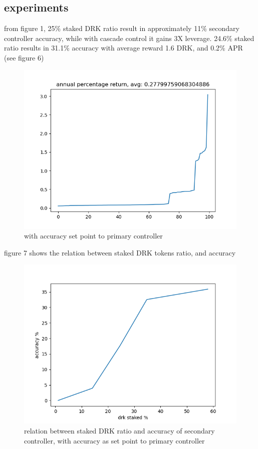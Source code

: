 \documentclass{article}
\begin{document}
\subsection {experiments}
\begin{description}
\item from figure 1, 25\% staked DRK ratio result in approximately 11\% secondary controller accuracy, while with cascade control it gains 3X leverage. 24.6\% staked ratio results in 31.1\% accuracy with average reward 1.6 DRK, and 0.2\% APR (see figure 6)
\end{description}
\begin{figure}
    \includegraphics{acc_setpoint_quarterstake.png}
    \caption{with accuracy set point to primary controller}
\end{figure}

\begin{description}
\item figure 7 shows the relation between staked DRK tokens ratio, and accuracy
\end{description}
\begin{figure}
  \includegraphics{acc_setpoint_vs_sr.png}
  \caption{relation between staked DRK ratio and accuracy of secondary controller, with accuracy as set point to primary controller}
\end{figure}
\end{document}
